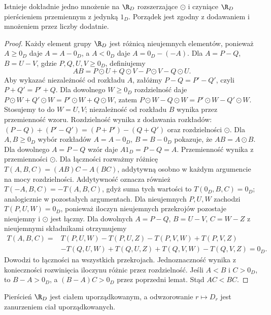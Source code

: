 \begin{twierdzenie}
\label{ma1:thm:cut-ring}
Istnieje dokładnie jedno mnożenie na $\R_D$ rozszerzające $\odot$ i czyniące $\R_D$ pierścieniem przemiennym z jedynką $1_D$. Porządek jest zgodny z dodawaniem i mnożeniem przez liczby dodatnie.
\end{twierdzenie}
\begin{proof}
Każdy element grupy $\R_D$ jest różnicą nieujemnych elementów, ponieważ $A\ge0_D$ daje $A=A-0_D$, a $A<0_D$ daje $A=0_D-(-A)$. Dla $A=P-Q$, $B=U-V$, gdzie $P,Q,U,V\ge0_D$, definiujemy
\[
 AB=P\odot U+Q\odot V-P\odot V-Q\odot U.
\]
Aby wykazać niezależność od rozkładu $A$, załóżmy $P-Q=P'-Q'$, czyli $P+Q'=P'+Q$. Dla dowolnego $W\ge0_D$ rozdzielność daje $P\odot W+Q'\odot W=P'\odot W+Q\odot W$, zatem $P\odot W-Q\odot W=P'\odot W-Q'\odot W$. Stosujemy to do $W=U,V$; niezależność od rozkładu $B$ wynika przez przemienność wzoru.
Rozdzielność wynika z dodawania rozkładów: $(P-Q)+(P'-Q')=(P+P')-(Q+Q')$ oraz rozdzielności $\odot$. Dla $A,B\ge0_D$ wybór rozkładów $A=A-0_D$, $B=B-0_D$ pokazuje, że $AB=A\odot B$. Dla dowolnego $A=P-Q$ wzór daje $A1_D=P-Q=A$. Przemienność wynika z przemienności $\odot$. Dla łączności rozważmy różnicę $T(A,B,C)=(AB)C-A(BC)$, addytywną osobno w każdym argumencie na mocy rozdzielności. Addytywność oznacza również $T(-A,B,C)=-T(A,B,C)$, gdyż suma tych wartości to $T(0_D,B,C)=0_D$; analogicznie w pozostałych argumentach. Dla nieujemnych $P,U,W$ zachodzi $T(P,U,W)=0_D$, ponieważ iloczyn nieujemnych przekrojów pozostaje nieujemny i $\odot$ jest łączny. Dla dowolnych $A=P-Q$, $B=U-V$, $C=W-Z$ z nieujemnymi składnikami otrzymujemy
\[
\begin{aligned}
T(A,B,C)={}&T(P,U,W)-T(P,U,Z)-T(P,V,W)+T(P,V,Z)\\
 &-T(Q,U,W)+T(Q,U,Z)+T(Q,V,W)-T(Q,V,Z)=0_D.
\end{aligned}
\]
Dowodzi to łączności na wszystkich przekrojach. Jednoznaczność wynika z konieczności rozwinięcia iloczynu różnic przez rozdzielność.
Jeśli $A<B$ i $C>0_D$, to $B-A>0_D$, a $(B-A)C>0_D$ przez poprzedni lemat. Stąd $AC<BC$. 
\end{proof}
\begin{twierdzenie}
\label{ma1:thm:cut-field}
Pierścień $\R_D$ jest ciałem uporządkowanym, a odwzorowanie $r\mapsto D_r$ jest zanurzeniem ciał uporządkowanych.
\end{twierdzenie}
